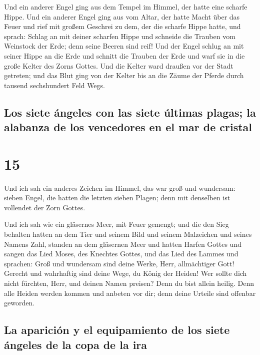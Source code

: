  Und ein anderer Engel ging aus dem Tempel im Himmel, der
hatte eine scharfe Hippe.  Und ein anderer Engel ging aus
vom Altar, der hatte Macht über das Feuer und rief mit großem Geschrei
zu dem, der die scharfe Hippe hatte, und sprach: Schlag an mit deiner
scharfen Hippe und schneide die Trauben vom Weinstock der Erde; denn
seine Beeren sind reif!  Und der Engel schlug an mit
seiner Hippe an die Erde und schnitt die Trauben der Erde und warf sie
in die große Kelter des Zorns Gottes.  Und die Kelter
ward draußen vor der Stadt getreten; und das Blut ging von der Kelter
bis an die Zäume der Pferde durch tausend sechshundert Feld Wegs.

\hypertarget{los-siete-uxe1ngeles-con-las-siete-uxfaltimas-plagas-la-alabanza-de-los-vencedores-en-el-mar-de-cristal}{%
\subsection{Los siete ángeles con las siete últimas plagas; la alabanza
de los vencedores en el mar de
cristal}\label{los-siete-uxe1ngeles-con-las-siete-uxfaltimas-plagas-la-alabanza-de-los-vencedores-en-el-mar-de-cristal}}

\hypertarget{section-14}{%
\section{15}\label{section-14}}

 Und ich sah ein anderes Zeichen im Himmel, das war groß
und wundersam: sieben Engel, die hatten die letzten sieben Plagen; denn
mit denselben ist vollendet der Zorn Gottes.

 Und ich sah wie ein gläsernes Meer, mit Feuer gemengt;
und die den Sieg behalten hatten an dem Tier und seinem Bild und seinem
Malzeichen und seines Namens Zahl, standen an dem gläsernen Meer und
hatten Harfen Gottes  und sangen das Lied Moses, des
Knechtes Gottes, und das Lied des Lammes und sprachen: Groß und
wundersam sind deine Werke, Herr, allmächtiger Gott! Gerecht und
wahrhaftig sind deine Wege, du König der Heiden!  Wer
sollte dich nicht fürchten, Herr, und deinen Namen preisen? Denn du bist
allein heilig. Denn alle Heiden werden kommen und anbeten vor dir; denn
deine Urteile sind offenbar geworden.

\hypertarget{la-apariciuxf3n-y-el-equipamiento-de-los-siete-uxe1ngeles-de-la-copa-de-la-ira}{%
\subsection{La aparición y el equipamiento de los siete ángeles de la
copa de la
ira}\label{la-apariciuxf3n-y-el-equipamiento-de-los-siete-uxe1ngeles-de-la-copa-de-la-ira}}

